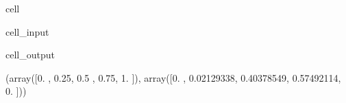 \documentclass[letterpaper,10pt,english]{jupyterBook}
\begin{document}
\begin{sphinxuseclass}{cell}\begin{sphinxVerbatimInput}

\begin{sphinxuseclass}{cell_input}
\begin{sphinxVerbatim}[commandchars=\\\{\}]
\end{sphinxVerbatim}

\end{sphinxuseclass}\end{sphinxVerbatimInput}
\begin{sphinxVerbatimOutput}

\begin{sphinxuseclass}{cell_output}
\begin{sphinxVerbatim}[commandchars=\\\{\}]
(array([0.  , 0.25, 0.5 , 0.75, 1.  ]),
 array([0.        , 0.02129338, 0.40378549, 0.57492114, 0.        ]))
\end{sphinxVerbatim}

\end{sphinxuseclass}\end{sphinxVerbatimOutput}

\end{sphinxuseclass}
\end{document}
